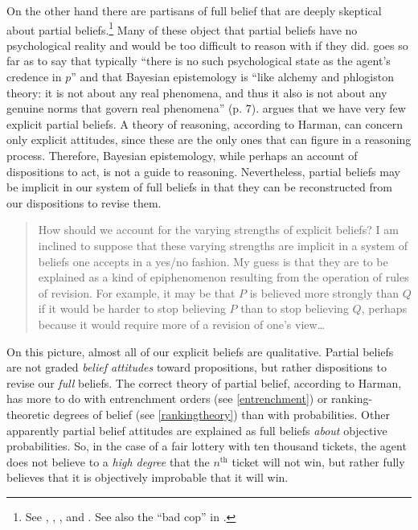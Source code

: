On the other hand there are partisans of full belief that are deeply skeptical
about partial beliefs.\footnote{See \citet{harman1986change},
\citet{pollock2006thinking}, \citet{moon2017beliefs}, and
\citet{horgan2017troubles}. See also the ``bad cop'' in \citet{hajek2017tale}.}
Many of these object that partial beliefs have no psychological reality and
would be too difficult to reason with if they did. \citet{horgan2017troubles}
goes so far as to say that typically ``there is no such psychological state as
the agent's credence in $p$'' and that Bayesian epistemology is ``like alchemy
and phlogiston theory: it is not about any real phenomena, and thus it also is
not about any genuine norms that govern real phenomena'' (p. 7).
\citet{harman1986change} argues that we have very few explicit partial beliefs.
A theory of reasoning, according to Harman, can concern only explicit attitudes,
since these are the only ones that can figure in a reasoning process. Therefore,
Bayesian epistemology, while perhaps an account of dispositions to act, is not a
guide to reasoning. Nevertheless, partial beliefs may be implicit in our system
of full beliefs in that they can be reconstructed from our dispositions to
revise them.
\begin{quote}
How should we account for the varying strengths of explicit beliefs? I am
inclined to suppose that these varying strengths are implicit in a system of
beliefs one accepts in a yes/no fashion. My guess is that they are to be
explained as a kind of epiphenomenon resulting from the operation of rules of
revision. For example, it may be that $P$ is believed more strongly than $Q$ if
it would be harder to stop believing $P$ than to stop believing $Q$, perhaps
because it would require more of a revision of one's view\ldots \citep[p.
22]{harman1986change}
\end{quote}
On this picture, almost all of our explicit beliefs are qualitative. Partial
beliefs are not graded {\em belief attitudes} toward propositions, but rather
dispositions to revise our {\em full} beliefs. The correct theory of partial
belief, according to Harman, has more to do with entrenchment orders (see
\autoref{entrenchment}) or ranking-theoretic degrees of belief (see
\autoref{rankingtheory}) than with probabilities. Other apparently partial
belief attitudes are explained as full beliefs {\em about} objective
probabilities. So, in the case of a fair lottery with ten thousand tickets, the
agent does not believe to a {\em high degree} that the $n^\text{th}$ ticket will
not win, but rather fully believes that it is objectively improbable that it
will win.

